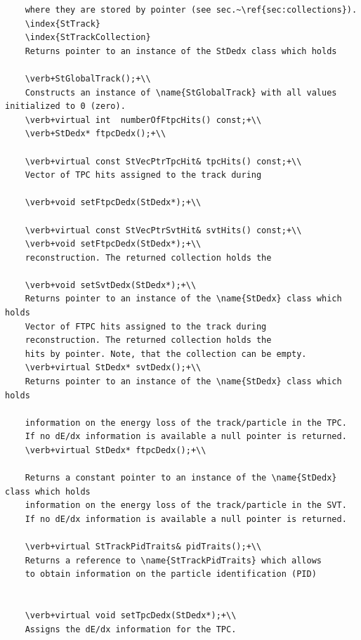 \begin{Entry}
{\begin{verbatim}
    where they are stored by pointer (see sec.~\ref{sec:collections}).
    \index{StTrack}
    \index{StTrackCollection}
    Returns pointer to an instance of the StDedx class which holds
    
    \verb+StGlobalTrack();+\\
    Constructs an instance of \name{StGlobalTrack} with all values initialized to 0 (zero).
    \verb+virtual int  numberOfFtpcHits() const;+\\
    \verb+StDedx* ftpcDedx();+\\
    
    \verb+virtual const StVecPtrTpcHit& tpcHits() const;+\\
    Vector of TPC hits assigned to the track during
    
    \verb+void setFtpcDedx(StDedx*);+\\    

    \verb+virtual const StVecPtrSvtHit& svtHits() const;+\\
    \verb+void setFtpcDedx(StDedx*);+\\
    reconstruction. The returned collection holds the
    
    \verb+void setSvtDedx(StDedx*);+\\
    Returns pointer to an instance of the \name{StDedx} class which holds
    Vector of FTPC hits assigned to the track during
    reconstruction. The returned collection holds the
    hits by pointer. Note, that the collection can be empty.
    \verb+virtual StDedx* svtDedx();+\\
    Returns pointer to an instance of the \name{StDedx} class which holds
    
    information on the energy loss of the track/particle in the TPC.
    If no dE/dx information is available a null pointer is returned.
    \verb+virtual StDedx* ftpcDedx();+\\
    
    Returns a constant pointer to an instance of the \name{StDedx} class which holds
    information on the energy loss of the track/particle in the SVT.
    If no dE/dx information is available a null pointer is returned.
    
    \verb+virtual StTrackPidTraits& pidTraits();+\\
    Returns a reference to \name{StTrackPidTraits} which allows
    to obtain information on the particle identification (PID)
    

    \verb+virtual void setTpcDedx(StDedx*);+\\
    Assigns the dE/dx information for the TPC.
    

\end{verbatim}}
\end{Entry}
